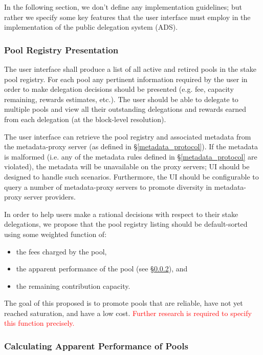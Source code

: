 In the following section, we don't define any implementation guidelines; but rather we specify some key features that the user interface must employ in the implementation of the public delegation system (ADS). 

\subsubsection{Pool Registry Presentation} \label{registry_presentation}
The user interface shall produce a list of all active and retired pools in the stake pool registry. For each pool any pertinent information required by the user in order to make delegation decisions should be presented (e.g. fee, capacity remaining, rewards estimates, etc.). The user should be able to delegate to multiple pools and view all their outstanding delegations and rewards earned from each delegation (at the block-level resolution). 

The user interface can retrieve the pool registry and associated metadata from the metadata-proxy server (as defined in \S\ref{metadata_protocol}). If the metadata is malformed (i.e. any of the metadata rules defined in \S\ref{metadata_protocol} are violated), the metadata will be unavailable on the proxy servers; UI should be designed to handle such scenarios. Furthermore, the UI should be configurable to query a number of metadata-proxy servers to promote diversity in metadata-proxy server providers. 

In order to help users make a rational decisions with respect to their stake delegations, we propose that the pool registry listing should be default-sorted using some weighted function of:  
\begin{itemize}[label=--,nosep]
    \item the fees charged by the pool, 
    \item the apparent performance of the pool (see \S\ref{apparent_perf}), and
    \item the remaining contribution capacity.
\end{itemize}
The goal of this proposed  is to promote pools that are reliable, have not yet reached saturation, and have a low cost. \textcolor{red}{Further research is required to specify this function precisely.}  

\subsubsection{Calculating Apparent Performance of Pools} \label{apparent_perf}

